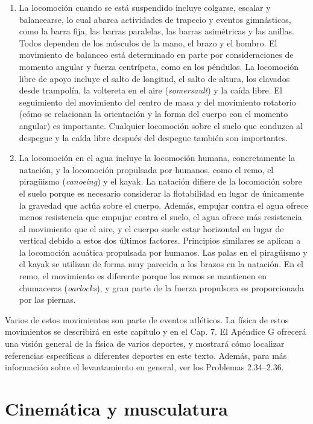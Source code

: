 \documentclass[12pt]{book}
\begin{document}
\begin{enumerate}
    \item[4.] La locomoción cuando se está suspendido incluye colgarse, escalar y balancearse, lo cual abarca actividades de trapecio y eventos gimnásticos, como la barra fija, las barras paralelas, las barras asimétricas y las anillas. Todos dependen de los músculos de la mano, el brazo y el hombro. El movimiento de balanceo está determinado en parte por consideraciones de momento angular y fuerza centrípeta, como en los péndulos. La locomoción libre de apoyo incluye el salto de longitud, el salto de altura, los clavados desde trampolín, la voltereta en el aire (\textit{somersault}) y la caída libre. El seguimiento del movimiento del centro de masa y del movimiento rotatorio (cómo se relacionan la orientación y la forma del cuerpo con el momento angular) es importante. Cualquier locomoción sobre el suelo que conduzca al despegue y la caída libre después del despegue también son importantes.
    
    \item[5.] La locomoción en el agua incluye la locomoción humana, concretamente la natación, y la locomoción propulsada por humanos, como el remo, el piragüismo (\textit{canoeing}) y el kayak. La natación difiere de la locomoción sobre el suelo porque es necesario considerar la flotabilidad en lugar de únicamente la gravedad que actúa sobre el cuerpo. Además, empujar contra el agua ofrece menos resistencia que empujar contra el suelo, el agua ofrece más resistencia al movimiento que el aire, y el cuerpo suele estar horizontal en lugar de vertical debido a estos dos últimos factores. Principios similares se aplican a la locomoción acuática propulsada por humanos. Las palas en el piragüismo y el kayak se utilizan de forma muy parecida a los brazos en la natación. En el remo, el movimiento es diferente porque los remos se mantienen en chumaceras (\textit{oarlocks}), y gran parte de la fuerza propulsora es proporcionada por las piernas.
\end{enumerate}

Varios de estos movimientos son parte de eventos atléticos. La física de estos movimientos se describirá en este capítulo y en el Cap. 7. El Apéndice G ofrecerá una visión general de la física de varios deportes, y mostrará cómo localizar referencias específicas a diferentes deportes en este texto. Además, para más información sobre el levantamiento en general, ver los Problemas 2.34--2.36.

\section{Cinemática y musculatura}
\end{document}
